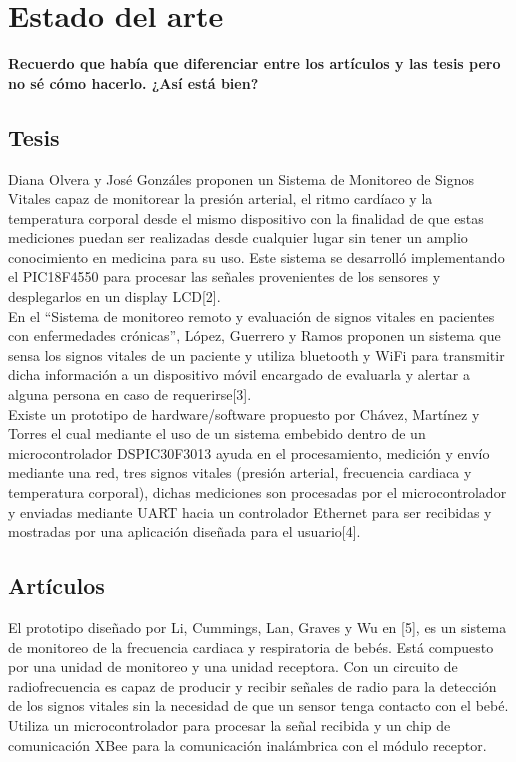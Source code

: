 
\section{Estado del arte}
\TODO \textbf{Recuerdo que había que diferenciar entre los artículos y las tesis pero no sé cómo hacerlo. ¿Así está bien?} 
\subsection{Tesis}
	Diana Olvera y José Gonzáles proponen un Sistema de Monitoreo de Signos Vitales capaz de monitorear la presión arterial, el ritmo cardíaco y la temperatura corporal desde el mismo dispositivo con la finalidad de que estas mediciones puedan ser realizadas desde cualquier lugar  sin tener un amplio conocimiento en medicina para su uso. Este sistema se desarrolló implementando el PIC18F4550 para procesar las señales provenientes de los sensores y desplegarlos en un display LCD[2].\\
	
	En el “Sistema de monitoreo remoto y evaluación de signos vitales en pacientes con enfermedades crónicas”, López, Guerrero y Ramos proponen un sistema que sensa los signos vitales de un paciente y utiliza bluetooth y WiFi para transmitir dicha información a un dispositivo móvil encargado de evaluarla y alertar a alguna persona en caso de requerirse[3].\\
	
	Existe un prototipo de hardware/software propuesto por Chávez, Martínez y Torres el cual mediante el uso de un sistema embebido dentro de un microcontrolador DSPIC30F3013 ayuda en el procesamiento, medición y envío mediante una red, tres signos vitales (presión arterial, frecuencia cardiaca y temperatura corporal), dichas mediciones son procesadas por el microcontrolador y enviadas mediante UART hacia un controlador Ethernet para ser recibidas y mostradas por una aplicación diseñada para el usuario[4]. \\

\subsection{Artículos}
	El prototipo diseñado por Li, Cummings, Lan, Graves y Wu en [5], es un sistema de monitoreo de la frecuencia cardiaca y respiratoria de bebés. Está compuesto por una unidad de monitoreo y una unidad receptora. Con un circuito de radiofrecuencia es capaz de producir y recibir señales de radio para la detección de los signos vitales sin la necesidad de que un sensor tenga contacto con el bebé. Utiliza un microcontrolador para procesar la señal recibida y un chip de comunicación XBee para la comunicación inalámbrica con el módulo receptor. \\
	
